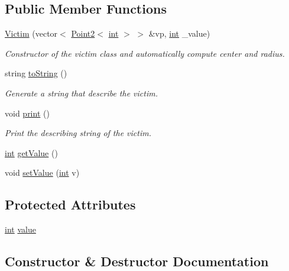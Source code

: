 \subsection*{Public Member Functions}
\begin{DoxyCompactItemize}
\item 
\mbox{\hyperlink{class_victim_ac3a9e66064c972ad6995fda9bf0ef922}{Victim}} (vector$<$ \mbox{\hyperlink{class_point2}{Point2}}$<$ \mbox{\hyperlink{draw_8hh_aa620a13339ac3a1177c86edc549fda9b}{int}} $>$ $>$ \&vp, \mbox{\hyperlink{draw_8hh_aa620a13339ac3a1177c86edc549fda9b}{int}} \+\_\+value)
\begin{DoxyCompactList}\small\item\em Constructor of the victim class and automatically compute center and radius. \end{DoxyCompactList}\item 
string \mbox{\hyperlink{class_victim_aaedbd4e32daf061d175b1550aa8456ae}{to\+String}} ()
\begin{DoxyCompactList}\small\item\em Generate a string that describe the victim. \end{DoxyCompactList}\item 
void \mbox{\hyperlink{class_victim_a432fa2051a52fa66ba84170f4b822b91}{print}} ()
\begin{DoxyCompactList}\small\item\em Print the describing string of the victim. \end{DoxyCompactList}\item 
\mbox{\hyperlink{draw_8hh_aa620a13339ac3a1177c86edc549fda9b}{int}} \mbox{\hyperlink{class_victim_af5536f96053aafe5a79cf6964224c664}{get\+Value}} ()
\item 
void \mbox{\hyperlink{class_victim_acb5121882a5728e2c4bb89b0f8ef6a8f}{set\+Value}} (\mbox{\hyperlink{draw_8hh_aa620a13339ac3a1177c86edc549fda9b}{int}} v)
\end{DoxyCompactItemize}
\subsection*{Protected Attributes}
\begin{DoxyCompactItemize}
\item 
\mbox{\hyperlink{draw_8hh_aa620a13339ac3a1177c86edc549fda9b}{int}} \mbox{\hyperlink{class_victim_aaf8d0993ea6201011a4a1a597dc2de2e}{value}}
\end{DoxyCompactItemize}


\subsection{Constructor \& Destructor Documentation}
\mbox{\label{class_victim_ac3a9e66064c972ad6995fda9bf0ef922}} 
